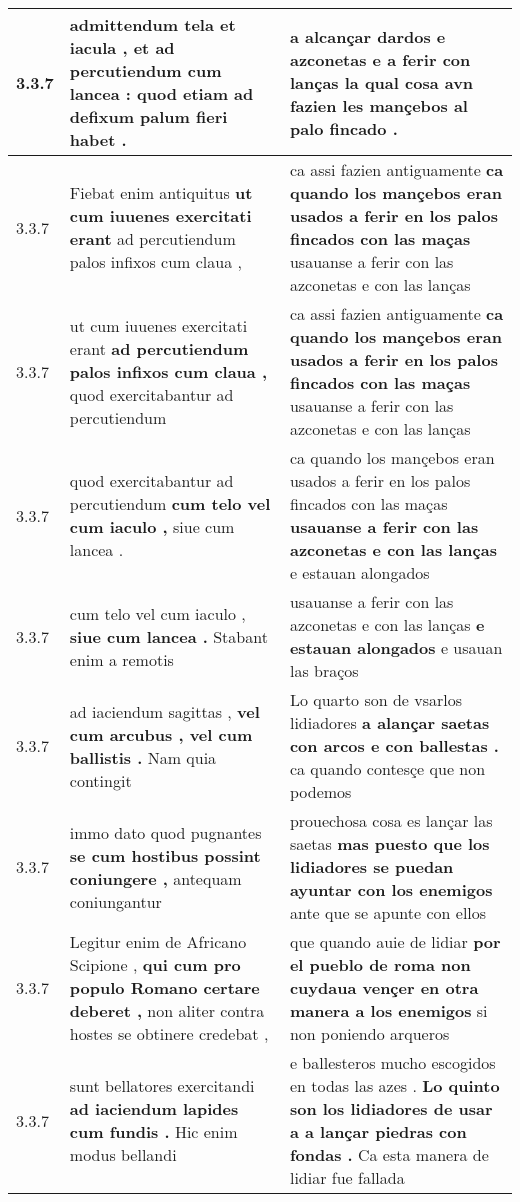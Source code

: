 \begin{tabular}{|p{1cm}|p{6.5cm}|p{6.5cm}|}
3.3.7 & admittendum tela et iacula , \textbf{ et ad percutiendum cum lancea : } quod etiam ad defixum palum fieri habet . & a alcançar dardos e azconetas \textbf{ e a ferir con lanças } la qual cosa avn fazien les mançebos al palo fincado . \\\hline
3.3.7 & Fiebat enim antiquitus \textbf{ ut cum iuuenes exercitati erant } ad percutiendum palos infixos cum claua , & ca assi fazien antiguamente \textbf{ ca quando los mançebos eran usados a ferir en los palos fincados con las maças } usauanse a ferir con las azconetas e con las lanças \\\hline
3.3.7 & ut cum iuuenes exercitati erant \textbf{ ad percutiendum palos infixos cum claua , } quod exercitabantur ad percutiendum & ca assi fazien antiguamente \textbf{ ca quando los mançebos eran usados a ferir en los palos fincados con las maças } usauanse a ferir con las azconetas e con las lanças \\\hline
3.3.7 & quod exercitabantur ad percutiendum \textbf{ cum telo vel cum iaculo , } siue cum lancea . & ca quando los mançebos eran usados a ferir en los palos fincados con las maças \textbf{ usauanse a ferir con las azconetas e con las lanças } e estauan alongados \\\hline
3.3.7 & cum telo vel cum iaculo , \textbf{ siue cum lancea . } Stabant enim a remotis & usauanse a ferir con las azconetas e con las lanças \textbf{ e estauan alongados } e usauan las braços \\\hline
3.3.7 & ad iaciendum sagittas , \textbf{ vel cum arcubus , vel cum ballistis . } Nam quia contingit & Lo quarto son de vsarlos lidiadores \textbf{ a alançar saetas con arcos e con ballestas . } ca quando contesçe que non podemos \\\hline
3.3.7 & immo dato quod pugnantes \textbf{ se cum hostibus possint coniungere , } antequam coniungantur & prouechosa cosa es lançar las saetas \textbf{ mas puesto que los lidiadores se puedan ayuntar con los enemigos } ante que se apunte con ellos \\\hline
3.3.7 & Legitur enim de Africano Scipione , \textbf{ qui cum pro populo Romano certare deberet , } non aliter contra hostes se obtinere credebat , & que quando auie de lidiar \textbf{ por el pueblo de roma non cuydaua vençer en otra manera a los enemigos } si non poniendo arqueros \\\hline
3.3.7 & sunt bellatores exercitandi \textbf{ ad iaciendum lapides cum fundis . } Hic enim modus bellandi & e ballesteros mucho escogidos en todas las azes . \textbf{ Lo quinto son los lidiadores de usar a a lançar piedras con fondas . } Ca esta manera de lidiar fue fallada \\\hline

\end{tabular}
